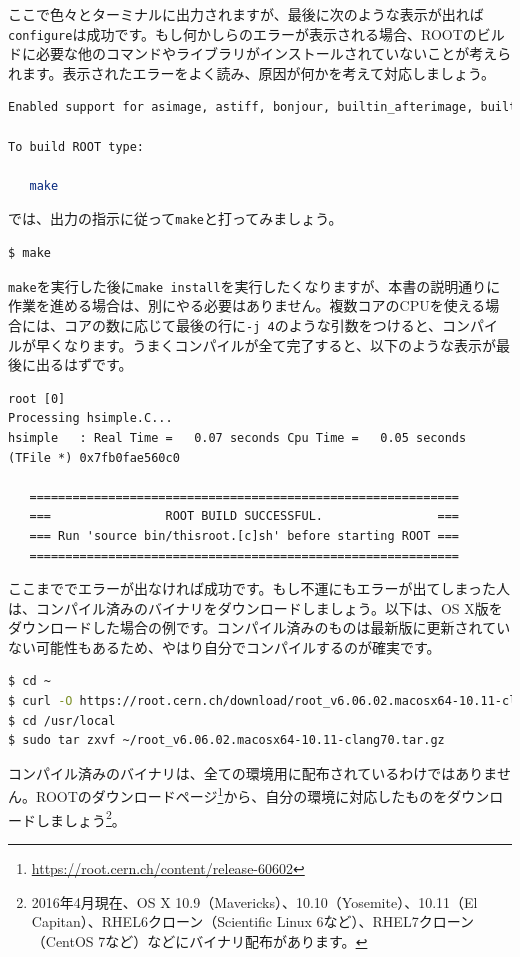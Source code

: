 ここで色々とターミナルに出力されますが、最後に次のような表示が出れば\texttt{configure}は成功です。もし何かしらのエラーが表示される場合、ROOTのビルドに必要な他のコマンドやライブラリがインストールされていないことが考えられます。表示されたエラーをよく読み、原因が何かを考えて対応しましょう。
\begin{lstlisting}[language=bash]
Enabled support for asimage, astiff, bonjour, builtin_afterimage, builtin_ftgl, builtin_freetype, builtin_glew, builtin_llvm, libcxx, cocoa, explicitlink, fink, fftw3, fitsio, gviz, genvector, krb5, ldap, mathmore, memstat, opengl, python, rpath, search_usrlocal, shared, sqlite, ssl, tmva, vdt, xml.

To build ROOT type:

   make 
\end{lstlisting}
では、出力の指示に従って\texttt{make}と打ってみましょう。
\begin{lstlisting}[language=bash]
$ make
\end{lstlisting}
\texttt{make}を実行した後に\texttt{make install}を実行したくなりますが、本書の説明通りに作業を進める場合は、別にやる必要はありません。複数コアのCPUを使える場合には、コアの数に応じて最後の行に\texttt{-j 4}のような引数をつけると、コンパイルが早くなります。うまくコンパイルが全て完了すると、以下のような表示が最後に出るはずです。
\begin{lstlisting}
root [0] 
Processing hsimple.C...
hsimple   : Real Time =   0.07 seconds Cpu Time =   0.05 seconds
(TFile *) 0x7fb0fae560c0
 
   ============================================================
   ===                ROOT BUILD SUCCESSFUL.                ===
   === Run 'source bin/thisroot.[c]sh' before starting ROOT ===
   ============================================================
\end{lstlisting}

ここまででエラーが出なければ成功です。もし不運にもエラーが出てしまった人は、コンパイル済みのバイナリをダウンロードしましょう。以下は、OS X版をダウンロードした場合の例です。コンパイル済みのものは最新版に更新されていない可能性もあるため、やはり自分でコンパイルするのが確実です。
\begin{lstlisting}[language=bash]
$ cd ~
$ curl -O https://root.cern.ch/download/root_v6.06.02.macosx64-10.11-clang70.tar.gz
$ cd /usr/local
$ sudo tar zxvf ~/root_v6.06.02.macosx64-10.11-clang70.tar.gz
\end{lstlisting}
コンパイル済みのバイナリは、全ての環境用に配布されているわけではありません。ROOTのダウンロードページ\footnote{\url{https://root.cern.ch/content/release-60602}}から、自分の環境に対応したものをダウンロードしましょう\footnote{2016年4月現在、OS X 10.9（Mavericks）、10.10（Yosemite）、10.11（El Capitan）、RHEL6クローン（Scientific Linux 6など）、RHEL7クローン（CentOS 7など）などにバイナリ配布があります。}。

